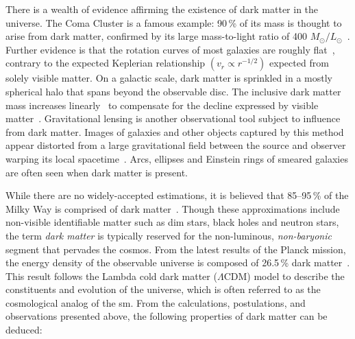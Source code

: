There is a wealth of evidence affirming the existence of dark matter in the universe. The Coma Cluster is a famous example: 90\,\% of its mass is thought to arise from dark matter, confirmed by its large mass-to-light ratio of 400 $M_{\odot} / L_{\odot}$~\cite{Yozin:2015mla}. Further evidence is that the rotation curves of most galaxies are roughly flat~\cite{1996MNRAS-281-27P}, contrary to the expected Keplerian relationship $(v_r \propto r^{-1/2})$ expected from solely visible matter. On a galactic scale, dark matter is sprinkled in a mostly spherical halo that spans beyond the observable disc. The inclusive dark matter mass increases linearly~\cite{2009arXiv0901.0632E} to compensate for the decline expressed by visible matter~\cite{1970ApJ-160-811F,1992AandA-256-19B}. Gravitational lensing is another observational tool subject to influence from dark matter. Images of galaxies and other objects captured by this method appear distorted from a large gravitational field between the source and observer warping its local spacetime~\cite{2010GReGr..42.2177H}. Arcs, ellipses and Einstein rings of smeared galaxies are often seen when dark matter is present.

\clearpage

While there are no widely-accepted estimations, it is believed that 85--95\,\% of the Milky Way is comprised of dark matter~\cite{2005MNRAS.364..433B,2006MNRAS.370.1055B,Kafle:2014xfa}. Though these approximations include non-visible identifiable matter such as dim stars, black holes and neutron stars, the term \emph{dark matter} is typically reserved for the non-luminous, \emph{non-baryonic} segment that pervades the cosmos. From the latest results of the Planck mission, the energy density of the observable universe is composed of 26.5\,\% dark matter~\cite{Aghanim:2018eyx}. This result follows the Lambda cold dark matter ($\Lambda\text{CDM}$) model to describe the constituents and evolution of the universe, which is often referred to as the cosmological analog of the \acrlong{sm}. From the calculations, postulations, and observations presented above, the following properties of dark matter can be deduced:

